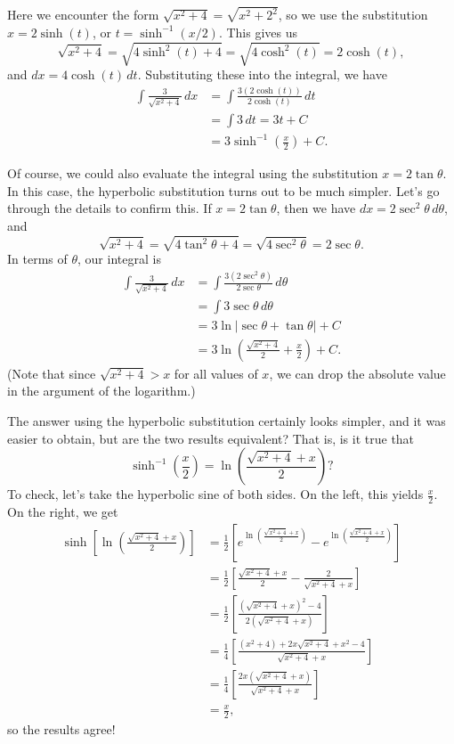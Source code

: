 {
Here we encounter the form $\sqrt{x^2+4} = \sqrt{x^2+2^2}$, so we use the substitution $x=2\sinh(t)$, or $t=\sinh^{-1}(x/2)$. This gives us
\[
\sqrt{x^2+4} = \sqrt{4\sinh^2(t)+4} = \sqrt{4\cosh^2(t)}=2\cosh(t),
\]
and $dx = 4\cosh(t)\,dt$. Substituting these into the integral, we have
\begin{align*}
\int\frac{3}{\sqrt{x^2+4}}\,dx &= \int \frac{3(2\cosh(t))}{2\cosh(t)}\,dt\\
& = \int 3 \,dt = 3t+C\\
& = 3\sinh^{-1}\left(\frac{x}{2}\right)+C.
\end{align*}

Of course, we could also evaluate the integral using the substitution $x=2\tan\theta$. In this case, the hyperbolic substitution turns out to be much simpler. Let's go through the details to confirm this. If $x=2\tan\theta$, then we have $dx = 2\sec^2\theta\,d\theta$, and
\[
\sqrt{x^2+4} = \sqrt{4\tan^2\theta+4} = \sqrt{4\sec^2\theta} = 2\sec\theta.
\]
In terms of $\theta$, our integral is
\begin{align*}
\int\frac{3}{\sqrt{x^2+4}}\,dx & = \int \frac{3(2\sec^2\theta)}{2\sec\theta}\,d\theta\\
 & = \int 3\sec\theta\,d\theta\\
 & = 3\ln\lvert \sec\theta +\tan\theta\rvert+C\\
 & = 3\ln\left( \frac{\sqrt{x^2+4}}{2} + \frac{x}{2}\right) +C.
\end{align*}
(Note that since $\sqrt{x^2+4}>x$ for all values of $x$, we can drop the absolute value in the argument of the logarithm.)

The answer using the hyperbolic substitution certainly looks simpler, and it was easier to obtain, but are the two results equivalent? That is, is it true that
\[
\sinh^{-1}\left(\frac{x}{2}\right) = \ln\left(\frac{\sqrt{x^2+4}+x}{2}\right)?
\]
To check, let's take the hyperbolic sine of both sides. On the left, this yields $\frac{x}{2}$. On the right, we get
\begin{align*}
\sinh\left[\ln\left(\frac{\sqrt{x^2+4}+x}{2}\right)\right] & = \frac{1}{2}\left[e^{\ln\left(\frac{\sqrt{x^2+4}+x}{2}\right)}-e^{\ln\left(\frac{\sqrt{x^2+4}+x}{2}\right)}\right]\\
& = \frac{1}{2}\left[\frac{\sqrt{x^2+4}+x}{2}-\frac{2}{\sqrt{x^2+4}+x}\right]\\
& = \frac{1}{2}\left[\frac{(\sqrt{x^2+4}+x)^2-4}{2(\sqrt{x^2+4}+x)}\right]\\
& = \frac{1}{4}\left[\frac{(x^2+4)+2x\sqrt{x^2+4}+x^2-4}{\sqrt{x^2+4}+x}\right]\\
& = \frac{1}{4}\left[\frac{2x(\sqrt{x^2+4}+x)}{\sqrt{x^2+4}+x}\right]\\
& = \frac{x}{2},
\end{align*}
so the results agree!
}\\

